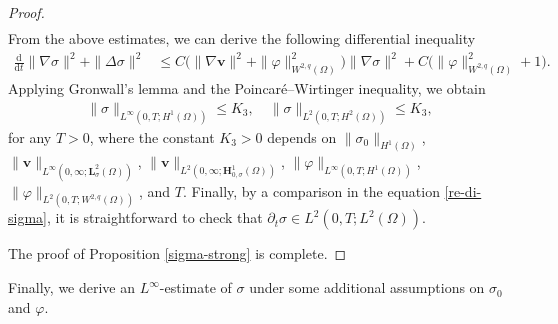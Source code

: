 \documentclass[11pt,reqno]{amsart}
\def\H{\bm{H}}
\def\L{\bm{L}}
\def\vv{\bm{v}}
\begin{document}
\begin{proof}
\begin{equation*}
\begin{aligned}
\end{aligned}
\end{equation*}
%
From the above estimates, we can derive the following differential inequality
%
\begin{equation}
\begin{aligned}
\frac{\mathrm{d}}{\mathrm{d} t} \|\nabla \sigma\|^2 + \|\Delta\sigma\|^2
&\le C\big(\|\nabla \vv \|^2+\|\varphi\|_{W^{2,q}(\Omega)}^2\big) \|\nabla \sigma\|^2
+ C\big(\|\varphi\|_{W^{2,q}(\Omega)}^2+1\big).
\end{aligned}
\label{es-sigH0}
\end{equation}
%
Applying Gronwall's lemma and the Poincar\'{e}--Wirtinger inequality, we obtain
%
\begin{align}
\|\sigma\|_{L^\infty(0,T;H^1(\Omega))}\leq K_3,\quad \|\sigma\|_{L^2(0,T;H^2(\Omega))}\leq K_3,
\label{es-sigH1}
\end{align}
%
for any $T>0$, where the constant $K_3>0$ depends on $\|\sigma_0\|_{H^1(\Omega)}$,
$\|\vv\|_{L^\infty(0,\infty;\L^2_{\sigma}(\Omega))}$, $\|\vv\|_{L^2(0,\infty;\H^1_{0,\sigma}(\Omega))}$,
$\|\varphi \|_{L^\infty(0,T;H^1(\Omega))}$, $\|\varphi\|_{L^2(0,T;W^{2,q}(\Omega))}$, and $T$. Finally, by a comparison in the equation \eqref{re-di-sigma}, it is straightforward to check that $\partial_t\sigma \in L^2(0,T;L^2(\Omega))$.

The proof of Proposition \ref{sigma-strong} is complete.
\end{proof}
%

Finally, we derive an $L^\infty$-estimate of $\sigma$ under some additional assumptions on $\sigma_0$ and $\varphi$.
\end{document}
